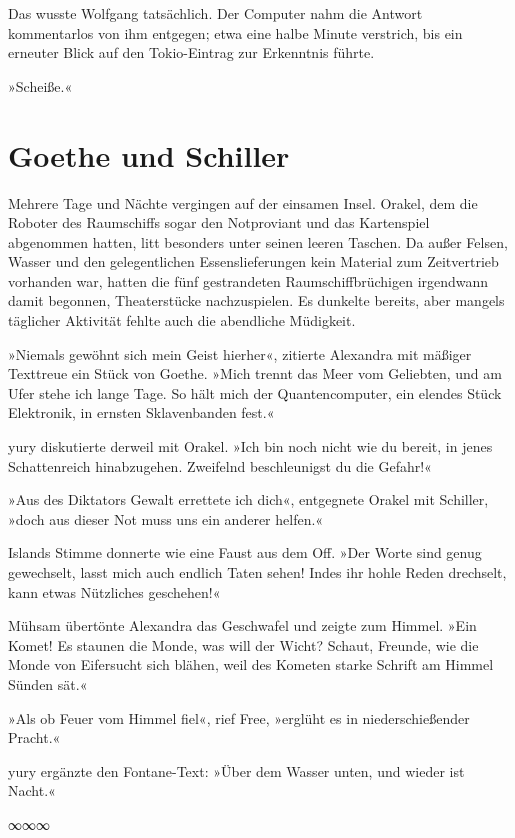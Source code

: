 Das wusste Wolfgang tatsächlich. Der Computer nahm die Antwort kommentarlos von ihm entgegen; etwa eine halbe Minute verstrich, bis ein erneuter Blick auf den Tokio-Eintrag zur Erkenntnis führte.

»Scheiße.«


\chapter{Goethe und Schiller}

Mehrere Tage und Nächte vergingen auf der einsamen Insel. Orakel, dem die Roboter des Raumschiffs sogar den Notproviant und das Kartenspiel abgenommen hatten, litt besonders unter seinen leeren Taschen. Da außer Felsen, Wasser und den gelegentlichen Essenslieferungen kein Material zum Zeitvertrieb vorhanden war, hatten die fünf gestrandeten Raumschiffbrüchigen irgendwann damit begonnen, Theaterstücke nachzuspielen. Es dunkelte bereits, aber mangels täglicher Aktivität fehlte auch die abendliche Müdigkeit.

»Niemals gewöhnt sich mein Geist hierher«, zitierte Alexandra mit mäßiger Texttreue ein Stück von Goethe. »Mich trennt das Meer vom Geliebten, und am Ufer stehe ich lange Tage. So hält mich der Quantencomputer, ein elendes Stück Elektronik, in ernsten Sklavenbanden fest.«

yury diskutierte derweil mit Orakel. »Ich bin noch nicht wie du bereit, in jenes Schattenreich hinabzugehen. Zweifelnd beschleunigst du die Gefahr!«

»Aus des Diktators Gewalt errettete ich dich«, entgegnete Orakel mit Schiller, »doch aus dieser Not muss uns ein anderer helfen.«

Islands Stimme donnerte wie eine Faust aus dem Off. »Der Worte sind genug gewechselt, lasst mich auch endlich Taten sehen! Indes ihr hohle Reden drechselt, kann etwas Nützliches geschehen!«

Mühsam übertönte Alexandra das Geschwafel und zeigte zum Himmel. »Ein Komet! Es staunen die Monde, was will der Wicht? Schaut, Freunde, wie die Monde von Eifersucht sich blähen, weil des Kometen starke Schrift am Himmel Sünden sät.«

»Als ob Feuer vom Himmel fiel«, rief Free, »erglüht es in niederschießender Pracht.«

yury ergänzte den Fontane-Text: »Über dem Wasser unten, und wieder ist Nacht.«

\begin{center}
∞∞∞
\end{center}

